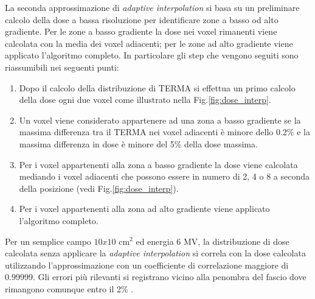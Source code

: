 {La seconda approssimazione di \textit{adaptive interpolation} si basa su un preliminare calcolo della dose a bassa risoluzione per identificare zone a basso od alto gradiente. Per le zone a basso gradiente la dose nei voxel rimanenti viene calcolata con la media dei voxel adiacenti; per le zone ad alto gradiente viene applicato l'algoritmo completo. In particolare gli step che vengono seguiti sono riassumibili nei seguenti punti:
\begin{enumerate}
\item Dopo il calcolo della distribuzione di TERMA si effettua un primo calcolo della dose ogni due voxel come illustrato nella Fig.\ref{fig:dose_interp}.
\item Un voxel viene considerato appartenere ad una zona a basso gradiente se la massima differenza tra il TERMA nei voxel adiacenti è minore dello 0.2\% e la massima differenza in dose è minore del 5\% della dose massima.
\item Per i voxel appartenenti alla zona a basso gradiente la dose viene calcolata mediando i voxel adiacenti che possono essere in numero di 2, 4 o 8 a seconda della posizione (vedi Fig.\ref{fig:dose_interp}).
\item Per i voxel appartenenti alla zona ad alto gradiente viene applicato l'algoritmo completo.
\end{enumerate}
Per un semplice campo $10x10$ cm$^2$ ed energia 6 MV, la distribuzione di dose calcolata senza applicare la \textit{adaptive interpolation} si correla con la dose calcolata utilizzando l'approssimazione con un coefficiente di correlazione maggiore di 0.99999. Gli errori più rilevanti si registrano vicino alla penombra del fascio dove rimangono comunque entro il 2\% \cite{RaySearchLaboratories2014}.


}
